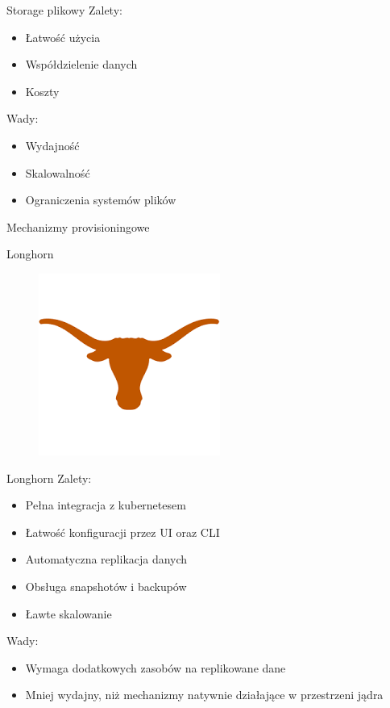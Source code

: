 \documentclass[polish,envcountsect,10pt]{beamer}
\begin{document}
\begin{frame}{Storage plikowy}
	Zalety:
	\begin{itemize}
		\item Łatwość użycia
		\item Współdzielenie danych
		\item Koszty
	\end{itemize}
	\medskip
	Wady:
	\begin{itemize}
		\item Wydajność
		\item Skalowalność
		\item Ograniczenia systemów plików
	\end{itemize}
\end{frame}

\begin{frame}{Mechanizmy provisioningowe}
\end{frame}

\begin{frame}{Longhorn}
	\begin{figure}[H]
    	\includegraphics[width=0.4\linewidth]{images/longhorn.png}
	\end{figure}
\end{frame}

\begin{frame}{Longhorn}
	Zalety:
	\begin{itemize}
		\item Pełna integracja z kubernetesem
		\item Łatwość konfiguracji przez UI oraz CLI
		\item Automatyczna replikacja danych
		\item Obsługa snapshotów i backupów
		\item Ławte skalowanie
	\end{itemize}
	\medskip
	Wady:
	\begin{itemize}
		\item Wymaga dodatkowych zasobów na replikowane dane
		\item Mniej wydajny, niż mechanizmy natywnie działające w przestrzeni jądra
	\end{itemize}
\end{frame}
\end{document}
